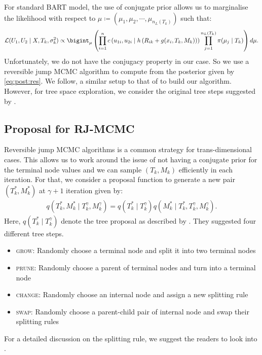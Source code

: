 \documentclass{amsart}
\begin{document}
For standard BART model, the use of conjugate prior allows us to marginalise the likelihood with respect to $\mu\coloneqq\left(\mu_1,\mu_2,\cdots,\mu_{n_L(T_k)}\right)$ such that:
\begin{equation*}
	\mathcal{L}(U_1,U_2\mid X, T_k, \sigma^2_{k})\propto \bigint_{\mu}\left(\prod_{i=1}^{n}c\left(u_{1i},u_{2i}\mid h\left(R_{ik}+g(x_i, T_k, M_k)\right)\right)\prod_{j=1}^{n_L(T_k)}\pi(\mu_j\mid T_k)\right)d\mu.
\end{equation*}
Unfortunately, we do not have the conjugacy property in our case. So we use a reversible jump MCMC algorithm \cite{green_RJMCMC} to compute from the posterior given by \cref{eq:post:res}. We follow, a similar setup to that of \citet{Linero02012025} to build our algorithm. However, for tree space exploration, we consider the original tree steps suggested by \cite{chipman98BCART}.

\subsection{Proposal for RJ-MCMC}

Reversible jump MCMC algorithms is a common strategy for trans-dimensional cases. This allows us to work around the issue of not having a conjugate prior for the terminal node values and we can sample $(T_k,M_k)$ efficiently in each iteration. For that, we consider a proposal function to generate a new pair $\left(T_k^\ast, M_k^\ast\right)$ at $\gamma+1$ iteration given by:
\begin{align}\label{eq:prop}
	q\left(T_k^\ast, M_k^\ast \mid T_k^{\gamma},M_k^{\gamma}\right) = q\left( T_k^\ast\mid T_k^{\gamma}\right) q\left(M_k^\ast\mid T_k^\ast, T_k^{\gamma}, M_k^{\gamma}\right).
\end{align}
Here, $q\left( T_k^\ast\mid T_k^{\gamma}\right)$ denote the tree proposal as described by \citet{chipman98BCART}. They suggested four different tree steps.
\begin{itemize}
	\item \textsc{grow}: Randomly choose a terminal node and split it into two terminal nodes
	\item \textsc{prune}: Randomly choose a parent of terminal nodes and turn into a terminal node
	\item \textsc{change}: Randomly choose an internal node and assign a new splitting rule
	\item \textsc{swap}: Randomly choose a parent-child pair of internal node and swap their splitting rules
\end{itemize}
For a detailed discussion on the splitting rule, we suggest the readers to look into \citet{chipman98BCART}. 
\end{document}
